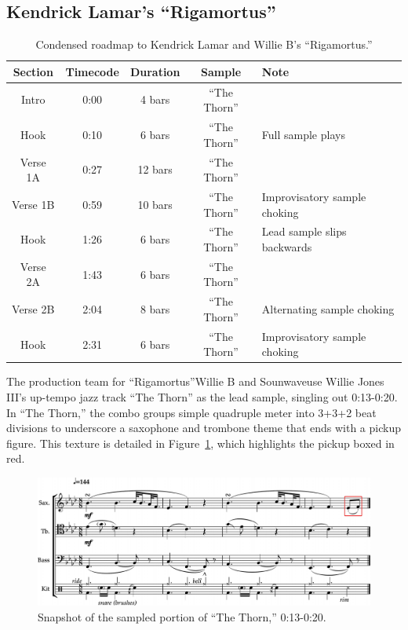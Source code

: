 \subsection*{\centering Kendrick Lamar's ``Rigamortus''}

    \begin{table}[ht]
        \centering
            \begin{tabular}{|c|c|c|c|l|}
                \hline
                Section  & Timecode & Duration & Sample        & Note \\ \hline
                Intro    & 0:00     & 4 bars   & ``The Thorn'' & \\ \hline
                Hook     & 0:10     & 6 bars   & ``The Thorn'' & Full sample plays \\ \hline
                Verse 1A & 0:27     & 12 bars  & ``The Thorn'' & \\ \hline
                Verse 1B & 0:59     & 10 bars  & ``The Thorn'' & Improvisatory sample choking \\ \hline
                Hook     & 1:26     & 6 bars   & ``The Thorn'' & Lead sample slips backwards \\ \hline
                Verse 2A & 1:43     & 6 bars   & ``The Thorn'' & \\ \hline
                Verse 2B & 2:04     & 8 bars   & ``The Thorn'' & Alternating sample choking \\ \hline
                Hook     & 2:31     & 6 bars   & ``The Thorn'' & Improvisatory sample choking\\ \hline
            \end{tabular}
        \caption{Condensed roadmap to Kendrick Lamar and Willie B's ``Rigamortus.''}
        \label{tab:rigamortus}
    \end{table}

The production team for ``Rigamortus''\textemdash Willie B and Sounwave\textemdash use Willie Jones 
III's up-tempo jazz track ``The Thorn'' as the lead sample,  singling out 0:13-0:20. In ``The Thorn,'' 
the combo groups simple quadruple meter into 3+3+2 beat divisions to underscore a saxophone and 
trombone theme that ends with a pickup figure. This texture is detailed in Figure~\ref{fig:thethornfull},
which highlights the pickup boxed in red.

    \begin{figure}[ht]
        \centering
        \includegraphics[width=\textwidth]{images/figures/chp 02/013020thethornfull.pdf}
        \caption{Snapshot of the sampled portion of ``The Thorn,'' 0:13-0:20.}
        \label{fig:thethornfull}
    \end{figure}

